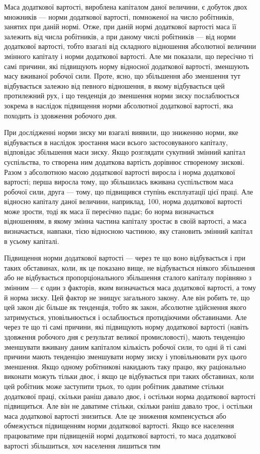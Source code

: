 Маса додаткової вартості, вироблена капіталом даної величини, є добуток двох множників — норми
додаткової вартості, помноженої на число робітників, занятих при даній нормі. Отже, при даній нормі
додаткової вартості маса її залежить від числа
робітників, а при даному числі робітників — від норми додаткової вартості, тобто взагалі від
складного відношення абсолютної
величини змінного капіталу і норми додаткової вартості. Але ми показали, що пересічно ті самі
причини, які підвищують норму відносної додаткової вартості, зменшують масу вживаної робочої сили.
Проте, ясно, що збільшення або зменшення тут відбувається залежно від певного відношення, в якому
відбувається цей протилежний рух, і що тенденція до зменшення норми зиску послаблюється зокрема в
наслідок підвищення норми абсолютної додаткової вартості, яка походить із здовження робочого дня.

При дослідженні норми зиску ми взагалі виявили, що зниженню норми, яке відбувається в наслідок
зростання маси всього застосовуваного капіталу, відповідає збільшення маси зиску. Якщо розглядати
сукупний змінний капітал суспільства, то
створена ним додаткова вартість дорівнює створеному зискові. Разом з абсолютною масою додаткової
вартості виросла і норма додаткової вартості; перша виросла тому, що збільшилась вживана
суспільством маса робочої сили, друга — тому, що підвищився ступінь експлуатації цієї праці. Але
відносно капіталу даної величини, наприклад, 100, норма додаткової вартості може зрости, тоді як
маса її пересічно падає; бо норма визначається відношенням, в якому змінна частина капіталу зростає
в своїй вартості, а маса визначається, навпаки, тією відносною частиною, яку становить змінний
капітал в усьому капіталі.

Підвищення норми додаткової вартості — через те що воно відбувається і при таких обставинах, коли,
як це показано вище, не відбувається ніякого збільшення або не відбувається пропорціонального
збільшення сталого капіталу порівняно з змінним — є один з факторів, яким визначається маса
додаткової вартості, а тому й норма зиску. Цей фактор не знищує загального закону. Але він робить
те, що цей закон діє більше як тенденція, тобто як закон, абсолютне здійснення якого затримується,
уповільнюється і ослаблюється протидіючими обставинами. Але через те що ті самі причини, які
підвищують норму додаткової вартості (навіть здовження робочого дня є результат великої
промисловості), мають тенденцію зменшувати вживану даним капіталом кількість робочої сили, то одні й
ті самі причини мають тенденцію зменшувати норму зиску і уповільнювати рух цього зменшення. Якщо
одному робітникові накидають таку працю, яку раціонально виконати можуть тільки двоє, і якщо це
відбувається при таких обставинах, коли цей робітник може заступити трьох, то один робітник даватиме
стільки додаткової праці, скільки раніш давало двоє, і остільки норма додаткової вартості
підвищиться. Але він не даватиме стільки, скільки раніш давало троє, і остільки маса додаткової
вартості знизиться. Але це зниження компенсується або обмежується підвищенням норми додаткової
вартості. Якщо все населення працюватиме при підвищеній нормі додаткової вартості, то маса
додаткової вартості збільшиться, хоч населення лишиться тим
\parbreak{}  %
